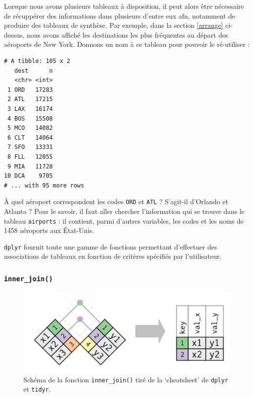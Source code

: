 \documentclass[a4paperpaper,]{article}
\newenvironment{Shaded}{\begin{snugshade}}{\end{snugshade}}
\newcommand{\KeywordTok}[1]{\textcolor[rgb]{0.12,0.11,0.11}{\textbf{#1}}}
\newcommand{\NormalTok}[1]{\textcolor[rgb]{0.12,0.11,0.11}{#1}}
\newcommand{\OperatorTok}[1]{\textcolor[rgb]{0.12,0.11,0.11}{#1}}
\newcommand{\StringTok}[1]{\textcolor[rgb]{0.75,0.01,0.01}{#1}}
\begin{document}
Lorsque nous avons plusieurs tableaux à disposition, il peut alors être nécessaire de récuppérer des informations dans plusieurs d'entre eux afn, notamment de produire des tableaux de synthèse. Par exemple, dans la section \ref{arrange} ci-dessus, nous avons affiché les destinations les plus fréquentes au départ des aéroports de New York. Donnons un nom à ce tableau pour pouvoir le ré-utiliser :

\begin{Shaded}
\end{Shaded}

\begin{verbatim}
# A tibble: 105 x 2
   dest      n
   <chr> <int>
 1 ORD   17283
 2 ATL   17215
 3 LAX   16174
 4 BOS   15508
 5 MCO   14082
 6 CLT   14064
 7 SFO   13331
 8 FLL   12055
 9 MIA   11728
10 DCA    9705
# ... with 95 more rows
\end{verbatim}

À quel aéroport correspondent les codes \texttt{ORD} et \texttt{ATL} ? S'agit-il d'Orlando et Atlanta ? Pour le savoir, il faut aller chercher l'information qui se trouve dans le tableau \texttt{airports} : il contient, parmi d'autres variables, les codes et les noms de 1458 aéroports aux État-Unis.

\texttt{dplyr} fournit toute une gamme de fonctions permettant d'effectuer des associations de tableaux en fonction de critères spécifiés par l'utilisateur.

\hypertarget{inner_join}{%
\subsubsection{\texorpdfstring{\texttt{inner\_join()}}{inner\_join()}}\label{inner_join}}

\begin{figure}[htpb]

{\centering \includegraphics[width=0.5\linewidth]{images/innerjoin} 

}

\caption{Schéma de la fonction \texttt{inner\_join()} tiré de la `cheatsheet' de \texttt{dplyr} et \texttt{tidyr}.}\label{fig:inner}
\end{figure}
\end{document}

